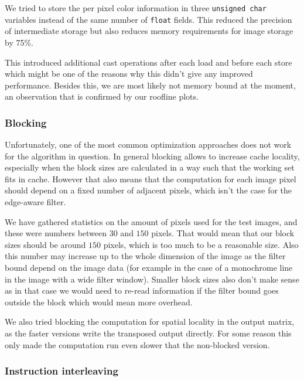 We tried to store the per pixel color information in three \texttt{unsigned char} variables instead of the same number of \texttt{float} fields. This reduced the precision of intermediate storage but also reduces memory requirements for image storage by 75\%. 

This introduced additional cast operations after each load and before each store which might be one of the reasons why this didn't give any improved performance. Besides this, we are most likely not memory bound at the moment, an observation that is confirmed by our roofline plots.


\subsubsection{Blocking}

Unfortunately, one of the most common optimization approaches does not work for the algorithm in question. In general blocking allows to increase cache locality, especially when the block sizes are calculated in a way such that the working set fits in cache. However that also means that the computation for each image pixel should depend on a fixed number of adjacent pixels, which isn't the case for the edge-aware filter.

We have gathered statistics on the amount of pixels used for the test images, and these were numbers between $30$ and $150$ pixels. That would mean that our block sizes should be around $150$ pixels, which is too much to be a reasonable size. Also this number may increase up to the whole dimension of the image as the filter bound depend on the image data (for example in the case of a monochrome line in the image with a wide filter window). Smaller block sizes also don't make sense as in that case we would need to re-read information if the filter bound goes outside the block which would mean more overhead. 

We also tried blocking the computation for spatial locality in the output matrix, as the faster versions write the transposed output directly. For some reason this only made the computation run even slower that the non-blocked version.

\subsubsection{Instruction interleaving}


